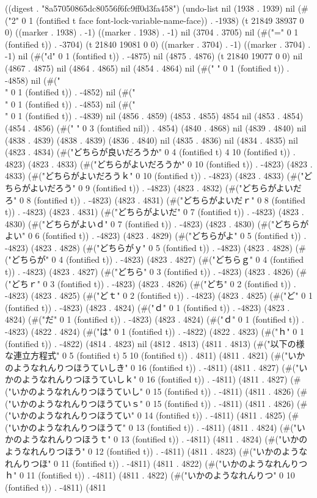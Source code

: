 
((digest . "8a57050865dc80556f6fc9ff0d3fa458") (undo-list nil (1938 . 1939) nil (#("2" 0 1 (fontified t face font-lock-variable-name-face)) . -1938) (t 21849 38937 0 0) ((marker . 1938) . -1) ((marker . 1938) . -1) nil (3704 . 3705) nil (#("=" 0 1 (fontified t)) . -3704) (t 21840 19081 0 0) ((marker . 3704) . -1) ((marker . 3704) . -1) nil (#("d" 0 1 (fontified t)) . -4875) nil (4875 . 4876) (t 21840 19077 0 0) nil (4867 . 4875) nil (4864 . 4865) nil (4854 . 4864) nil (#(" " 0 1 (fontified t)) . -4858) nil (#("\\" 0 1 (fontified t)) . -4852) nil (#("\\" 0 1 (fontified t)) . -4853) nil (#("\\" 0 1 (fontified t)) . -4839) nil (4856 . 4859) (4853 . 4855) 4854 nil (4853 . 4854) (4854 . 4856) (#("   " 0 3 (fontified nil)) . 4854) (4840 . 4868) nil (4839 . 4840) nil (4838 . 4839) (4838 . 4839) (4836 . 4840) nil (4835 . 4836) nil (4834 . 4835) nil (4823 . 4834) (#("どちらが良いだろうか" 0 4 (fontified t) 4 10 (fontified t)) . 4823) (4823 . 4833) (#("どちらがよいだろうか" 0 10 (fontified t)) . -4823) (4823 . 4833) (#("どちらがよいだろうｋ" 0 10 (fontified t)) . -4823) (4823 . 4833) (#("どちらがよいだろう" 0 9 (fontified t)) . -4823) (4823 . 4832) (#("どちらがよいだろ" 0 8 (fontified t)) . -4823) (4823 . 4831) (#("どちらがよいだｒ" 0 8 (fontified t)) . -4823) (4823 . 4831) (#("どちらがよいだ" 0 7 (fontified t)) . -4823) (4823 . 4830) (#("どちらがよいｄ" 0 7 (fontified t)) . -4823) (4823 . 4830) (#("どちらがよい" 0 6 (fontified t)) . -4823) (4823 . 4829) (#("どちらがよ" 0 5 (fontified t)) . -4823) (4823 . 4828) (#("どちらがｙ" 0 5 (fontified t)) . -4823) (4823 . 4828) (#("どちらが" 0 4 (fontified t)) . -4823) (4823 . 4827) (#("どちらｇ" 0 4 (fontified t)) . -4823) (4823 . 4827) (#("どちら" 0 3 (fontified t)) . -4823) (4823 . 4826) (#("どちｒ" 0 3 (fontified t)) . -4823) (4823 . 4826) (#("どち" 0 2 (fontified t)) . -4823) (4823 . 4825) (#("どｔ" 0 2 (fontified t)) . -4823) (4823 . 4825) (#("ど" 0 1 (fontified t)) . -4823) (4823 . 4824) (#("ｄ" 0 1 (fontified t)) . -4823) (4823 . 4824) (#("だ" 0 1 (fontified t)) . -4823) (4823 . 4824) (#("ｄ" 0 1 (fontified t)) . -4823) (4822 . 4824) (#("は" 0 1 (fontified t)) . -4822) (4822 . 4823) (#("ｈ" 0 1 (fontified t)) . -4822) (4814 . 4823) nil (4812 . 4813) (4811 . 4813) (#("以下の様な連立方程式" 0 5 (fontified t) 5 10 (fontified t)) . 4811) (4811 . 4821) (#("いかのようなれんりつほうていしき" 0 16 (fontified t)) . -4811) (4811 . 4827) (#("いかのようなれんりつほうていしｋ" 0 16 (fontified t)) . -4811) (4811 . 4827) (#("いかのようなれんりつほうていし" 0 15 (fontified t)) . -4811) (4811 . 4826) (#("いかのようなれんりつほうていｓ" 0 15 (fontified t)) . -4811) (4811 . 4826) (#("いかのようなれんりつほうてい" 0 14 (fontified t)) . -4811) (4811 . 4825) (#("いかのようなれんりつほうて" 0 13 (fontified t)) . -4811) (4811 . 4824) (#("いかのようなれんりつほうｔ" 0 13 (fontified t)) . -4811) (4811 . 4824) (#("いかのようなれんりつほう" 0 12 (fontified t)) . -4811) (4811 . 4823) (#("いかのようなれんりつほ" 0 11 (fontified t)) . -4811) (4811 . 4822) (#("いかのようなれんりつｈ" 0 11 (fontified t)) . -4811) (4811 . 4822) (#("いかのようなれんりつ" 0 10 (fontified t)) . -4811) (4811 
